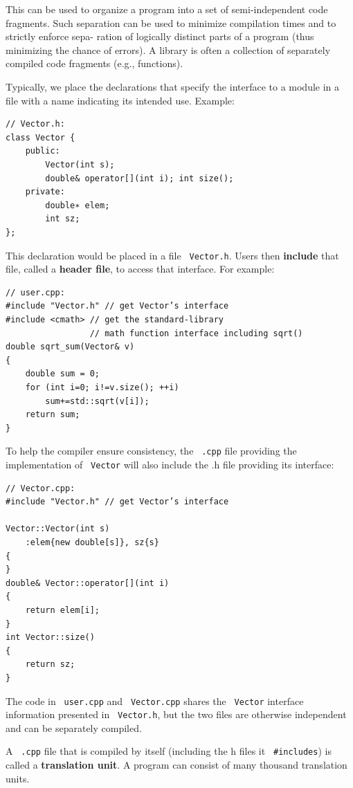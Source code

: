 \documentclass[11pt]{article}
\let\OldTexttt\texttt
\renewcommand{\texttt}[1]{\OldTexttt{\color{MidnightBlue} #1}}
\begin{document}
This can be used to organize a program into a set of semi-independent code fragments. Such
separation can be used to minimize compilation times and to strictly enforce sepa- ration of
logically distinct parts of a program (thus minimizing the chance of errors). A library is often
a collection of separately compiled code fragments (e.g., functions).

Typically, we place the declarations that specify the interface to a module in a file with a
name indicating its intended use. Example:
\begin{verbatim}
// Vector.h:
class Vector {
    public:
        Vector(int s);
        double& operator[](int i); int size();
    private:
        double∗ elem;
        int sz;
};
\end{verbatim}

This declaration would be placed in a file \texttt{Vector.h}. Users then \textbf{include} that file, called a
\textbf{header file}, to access that interface. For example:
\begin{verbatim}
// user.cpp:
#include "Vector.h" // get Vector’s interface
#include <cmath> // get the standard-library
                 // math function interface including sqrt()
double sqrt_sum(Vector& v)
{
    double sum = 0;
    for (int i=0; i!=v.size(); ++i)
        sum+=std::sqrt(v[i]);
    return sum;
}
\end{verbatim}

To help the compiler ensure consistency, the \texttt{.cpp} file providing the implementation of \texttt{Vector}
will also include the .h file providing its interface:
\begin{verbatim}
// Vector.cpp:
#include "Vector.h" // get Vector’s interface
                
Vector::Vector(int s)
    :elem{new double[s]}, sz{s}
{    
}
double& Vector::operator[](int i)
{
    return elem[i];
}
int Vector::size()
{
    return sz;
}
\end{verbatim}

The code in \texttt{user.cpp} and \texttt{Vector.cpp} shares the \texttt{Vector} interface information presented in
\texttt{Vector.h}, but the two files are otherwise independent and can be separately compiled.

A \texttt{.cpp} file that is compiled by itself (including the h files it \texttt{\#includes}) is called a
\textbf{translation unit}. A program can consist of many thousand translation units.
\end{document}

